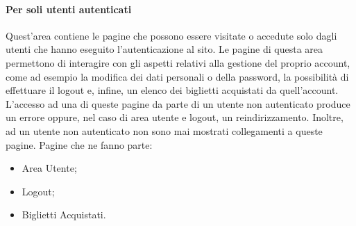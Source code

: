 \paragraph{Per soli utenti autenticati}
Quest'area contiene le pagine che possono essere visitate o accedute solo dagli utenti che hanno eseguito l'autenticazione al sito. Le pagine di questa area permettono di interagire con gli aspetti relativi alla gestione del proprio account, come ad esempio la modifica dei dati personali o della password, la possibilità di effettuare il logout e, infine, un elenco dei biglietti acquistati da quell'account. L'accesso ad una di queste pagine da parte di un utente non autenticato produce un errore oppure, nel caso di area utente e logout, un reindirizzamento. Inoltre, ad un utente non autenticato non sono mai mostrati collegamenti a queste pagine.
Pagine che ne fanno parte:
\begin{itemize}
	\item Area Utente;
	\item Logout;
	\item Biglietti Acquistati.
\end{itemize}

